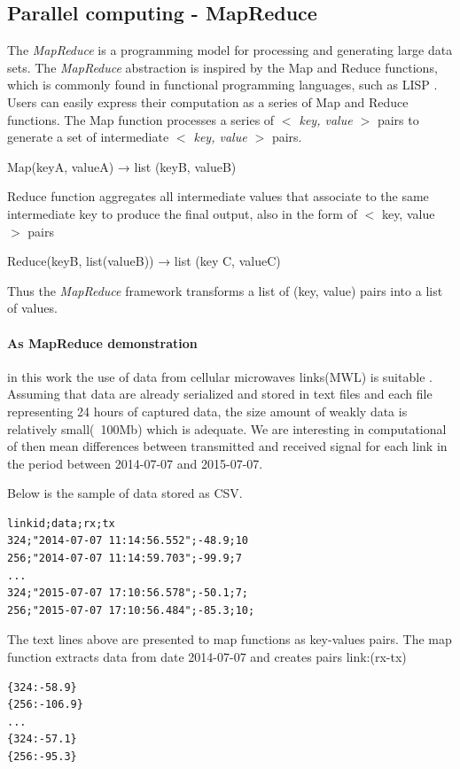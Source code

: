 \documentclass[a4paper,12pt,oneside]{report}
\begin{document}
	\subsection{Parallel computing - MapReduce}		
The \emph{MapReduce} is a programming model for processing and generating large data
sets. The \emph{MapReduce} abstraction is inspired by the Map and Reduce functions, which is commonly
found in functional programming languages, such as LISP \cite{lisp}. Users can easily express their
computation as a series of Map and Reduce functions. The Map function processes a series of
\textit{$<$ key, value $>$} pairs to generate a set of intermediate \textit{$<$ key, value $>$} pairs.

\begin{center}
Map(keyA, valueA) → list (keyB, valueB)
\end{center}
Reduce function aggregates all intermediate values that associate to the same intermediate key
to produce the final output, also in the form of $<$ key, value $>$ pairs
\begin{center}
Reduce(keyB, list(valueB)) → list (key C, valueC)
\end{center}
Thus the \emph{MapReduce} framework transforms a list of (key, value) pairs into a list of values. 


\paragraph{As MapReduce demonstration} in this work the use of data from cellular microwaves links(MWL)  is suitable . 
Assuming that data are already serialized and stored in text files and each file representing 24 hours 
of captured data, the size amount of weakly data is relatively small(~100Mb) which is adequate.
We are interesting in computational of then  mean differences between transmitted and received signal for 
each link in the period between 2014-07-07 and 2015-07-07.

Below is the sample of data stored as CSV.
\begin{footnotesize}
\begin{lstlisting}[style=mybash]
linkid;data;rx;tx
324;"2014-07-07 11:14:56.552";-48.9;10
256;"2014-07-07 11:14:59.703";-99.9;7
...
324;"2015-07-07 17:10:56.578";-50.1;7;
256;"2015-07-07 17:10:56.484";-85.3;10;
\end{lstlisting}\end{footnotesize}
 
The text lines above are presented to map functions as key-values pairs.
The map function extracts data from date 2014-07-07 and creates pairs {link:(rx-tx)}
\begin{footnotesize}
\begin{lstlisting}[style=mybash]
{324:-58.9}
{256:-106.9}
...
{324:-57.1}
{256:-95.3}
\end{lstlisting}\end{footnotesize}
\end{document}
